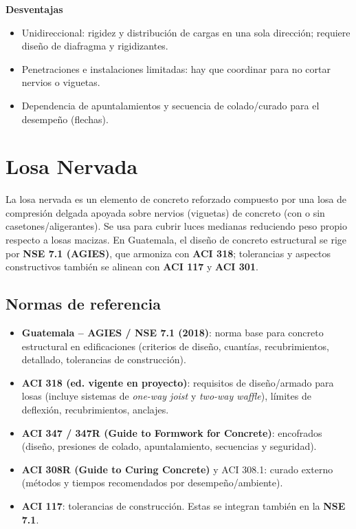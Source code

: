 \documentclass[12pt]{article}
\begin{document}
	\textbf{Desventajas}
	\begin{itemize}
		\item Unidireccional: rigidez y distribución de cargas en una sola dirección; requiere diseño de diafragma y rigidizantes.
		\item Penetraciones e instalaciones limitadas: hay que coordinar para no cortar nervios o viguetas.
		\item Dependencia de apuntalamientos y secuencia de colado/curado para el desempeño (flechas).
	\end{itemize}
	

	
	
	
	
	
	
	
	
	
	
	
	
	\section{Losa Nervada}
	
	La losa nervada es un elemento de concreto reforzado compuesto por una losa de compresión delgada apoyada sobre nervios (viguetas) de concreto (con o sin casetones/aligerantes). Se usa para cubrir luces medianas reduciendo peso propio respecto a losas macizas. En Guatemala, el diseño de concreto estructural se rige por \textbf{NSE 7.1 (AGIES)}, que armoniza con \textbf{ACI 318}; tolerancias y aspectos constructivos también se alinean con \textbf{ACI 117} y \textbf{ACI 301}.
	
	\subsection{Normas de referencia}
	\begin{itemize}
		\item \textbf{Guatemala – AGIES / NSE 7.1 (2018)}: norma base para concreto estructural en edificaciones (criterios de diseño, cuantías, recubrimientos, detallado, tolerancias de construcción).
		\item \textbf{ACI 318 (ed. vigente en proyecto)}: requisitos de diseño/armado para losas (incluye sistemas de \textit{one-way joist} y \textit{two-way waffle}), límites de deflexión, recubrimientos, anclajes.
		\item \textbf{ACI 347 / 347R (Guide to Formwork for Concrete)}: encofrados (diseño, presiones de colado, apuntalamiento, secuencias y seguridad).
		\item \textbf{ACI 308R (Guide to Curing Concrete)} y ACI 308.1: curado externo (métodos y tiempos recomendados por desempeño/ambiente).
		\item \textbf{ACI 117}: tolerancias de construcción. Estas se integran también en la \textbf{NSE 7.1}.
	\end{itemize}
	
\end{document}
